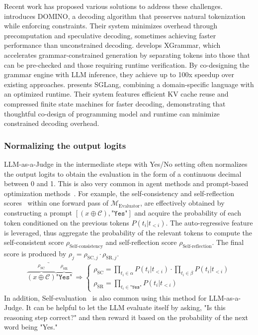 \documentclass[acmsmall,screen]{acmart}
\begin{document}
Recent work has proposed various solutions to address these challenges. \cite{beurer-kellner_guiding_2024} introduces DOMINO, a decoding algorithm that preserves natural tokenization while enforcing constraints. Their system minimizes overhead through precomputation and speculative decoding, sometimes achieving faster performance than unconstrained decoding. \cite{dong_xgrammar_2024} develops XGrammar, which accelerates grammar-constrained generation by separating tokens into those that can be pre-checked and those requiring runtime verification. By co-designing the grammar engine with LLM inference, they achieve up to 100x speedup over existing approaches.\cite{zheng_sglang_2024} presents SGLang, combining a domain-specific language with an optimized runtime. Their system features efficient KV cache reuse and compressed finite state machines for faster decoding, demonstrating that thoughtful co-design of programming model and runtime can minimize constrained decoding overhead.





\subsubsection{\textbf{Normalizing the output logits}}
LLM-as-a-Judge in the intermediate steps with Yes/No setting often normalizes the output logits to obtain the evaluation in the form of a continuous decimal between 0 and 1. This is also very common in agent methods and prompt-based optimization methods~\cite{hao2023reasoning, zhuang2023toolchain, speculative_rag}. For example, the self-consistency and self-reflection scores~\citep{speculative_rag} within one forward pass of $\mathcal{M}_\text{Evaluator}$, are effectively obtained by constructing a prompt $[\left( x \oplus \mathcal{C} \right), \texttt{"Yes"}]$ and acquire the probability of each token conditioned on the previous tokens $P(t_i | t_{<i})$. The auto-regressive feature is leveraged, thus aggregate the probability of the relevant tokens to compute the self-consistent score $\rho_\text{Self-consistency}$ and self-reflection score $\rho_\text{Self-reflection}$. The final score is produced by $\rho_j = \rho_{\text{SC},j} \cdot \rho_{\text{SR},j}$.
\begin{align*}
    \underrightarrow{ \overbrace{\left( x \oplus \mathcal{C} \right)}^{\rho_\text{SC}} 
    \overbrace{\texttt{"Yes"}}^{\rho_\text{SR}}} \  \Rightarrow
    \begin{cases}
    \rho_\text{SC} = \prod_{t_i\in \alpha} P(t_i|t_{<i}) \cdot \prod_{t_i\in \beta} P(t_i|t_{<i})\\ \rho_\text{SR} = \prod_{t_i\in \texttt{"Yes"}} P(t_i|t_{<i})
    \end{cases}
\end{align*}
In addition, Self-evaluation~\citep{hao2023reasoning} is also common using this method for LLM-as-a-Judge. It can be helpful to let the LLM evaluate itself by asking, "Is this reasoning step correct?" and then reward it based on the probability of the next word being "Yes."
\end{document}
